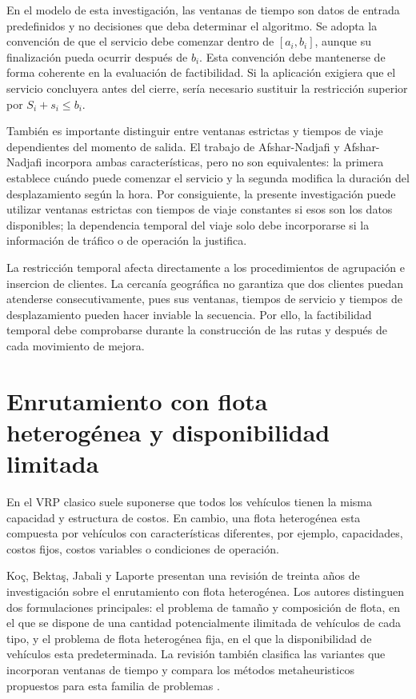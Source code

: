 En el modelo de esta investigación, las ventanas de tiempo son datos de entrada predefinidos y no decisiones que deba determinar el algoritmo. Se adopta la convención de que el servicio debe comenzar dentro de $[a_i,b_i]$, aunque su finalización pueda ocurrir después de $b_i$. Esta convención debe mantenerse de forma coherente en la evaluación de factibilidad. Si la aplicación exigiera que el servicio concluyera antes del cierre, sería necesario sustituir la restricción superior por $S_i+s_i\leq b_i$.

También es importante distinguir entre ventanas estrictas y tiempos de viaje dependientes del momento de salida. El trabajo de Afshar-Nadjafi y Afshar-Nadjafi incorpora ambas características, pero no son equivalentes: la primera establece cuándo puede comenzar el servicio y la segunda modifica la duración del desplazamiento según la hora. Por consiguiente, la presente investigación puede utilizar ventanas estrictas con tiempos de viaje constantes si esos son los datos disponibles; la dependencia temporal del viaje solo debe incorporarse si la información de tráfico o de operación la justifica.

La restricción temporal afecta directamente a los procedimientos de agrupación e insercion de clientes. La cercanía geográfica no garantiza que dos clientes puedan atenderse consecutivamente, pues sus ventanas, tiempos de servicio y tiempos de desplazamiento pueden hacer inviable la secuencia. Por ello, la factibilidad temporal debe comprobarse durante la construcción de las rutas y después de cada movimiento de mejora.

\section{Enrutamiento con flota heterogénea y disponibilidad limitada}
\label{sec:flota_heterogenea}

En el VRP clasico suele suponerse que todos los vehículos tienen la misma capacidad y estructura de costos. En cambio, una flota heterogénea esta compuesta por vehículos con características diferentes, por ejemplo, capacidades, costos fijos, costos variables o condiciones de operación.

Ko\c{c}, Bekta\c{s}, Jabali y Laporte presentan una revisión de treinta años de investigación sobre el enrutamiento con flota heterogénea. Los autores distinguen dos formulaciones principales: el problema de tamaño y composición de flota, en el que se dispone de una cantidad potencialmente ilimitada de vehículos de cada tipo, y el problema de flota heterogénea fija, en el que la disponibilidad de vehículos esta predeterminada. La revisión también clasifica las variantes que incorporan ventanas de tiempo y compara los métodos metaheuristicos propuestos para esta familia de problemas \cite{koc2016}.

